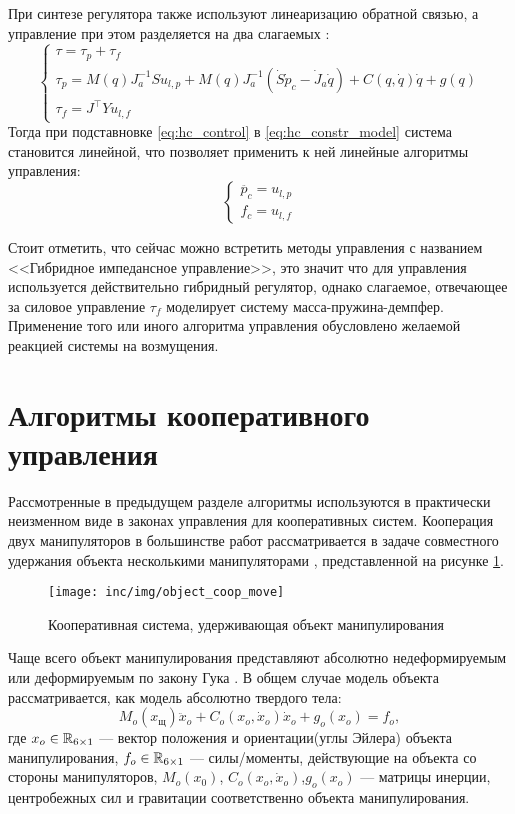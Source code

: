 При синтезе регулятора также используют линеаризацию обратной связью, а управление при этом разделяется на два слагаемых \cite{indirect_to_direct}:
\begin{equation}
  \begin{cases}
      \tau = \tau_p + \tau_f\\
      \tau_p = M(q) J_a^{-1} S u_{l,p} + M(q) J_a^{-1}\left(\dot{S}\dot{p}_c - \dot{J}_a\dot{q} \right) + C(q,\dot{q})\dot{q} + g(q)\\
      \tau_f = J^\top Y u_{l,f}
  \end{cases}
  \label{eq:hc_control}
\end{equation}
Тогда при подставновке \eqref{eq:hc_control} в \eqref{eq:hc_constr_model} система становится линейной, что позволяет применить к ней линейные алгоритмы управления:
\begin{equation}
  \begin{cases}
    \ddot{p_c} = u_{l,p}\\
    f_c = u_{l,f}
  \end{cases}
\end{equation}

Стоит отметить, что сейчас можно встретить методы управления с названием <<Гибридное импедансное управление>>, это значит что для управления используется действительно гибридный регулятор, однако слагаемое, отвечающее за силовое управление $\tau_f$ моделирует систему масса-пружина-демпфер. Применение того или иного алгоритма управления обусловлено желаемой реакцией системы на возмущения.

\section{Алгоритмы кооперативного управления}
Рассмотренные в предыдущем разделе алгоритмы используются в практически неизменном виде в законах управления для кооперативных систем. Кооперация двух манипуляторов в большинстве работ рассматривается в задаче совместного удержания объекта несколькими манипуляторами \cite{Bonitz1996, Erhart2015, Kido2010}, представленной на рисунке \ref{coop_obj_handle}.
\begin{figure}[ht]
  \texttt{[image: inc/img/object\_coop\_move]}
  \caption{Кооперативная система, удерживающая объект манипулирования}
  \label{coop_obj_handle}
\end{figure}

Чаще всего объект манипулирования представляют абсолютно недеформируемым \cite{Schneider1989} или деформируемым по закону Гука \cite{Sun1996}. В общем случае модель объекта рассматривается, как модель абсолютно твердого тела:
\begin{equation}
        M_o(x_щ)\ddot{x}_o + C_o(x_o,\dot{x}_o)\dot{x}_o + g_o(x_o) =  f_o ,
        \label{eq:obj_base_model}
    \end{equation}
где $x_o \in \mathbb{R}_{6\times1}$ --- вектор положения и ориентации(углы Эйлера) объекта манипулирования, $f_o \in \mathbb{R}_{6\times1}$ --- силы/моменты, действующие на объекта со стороны манипуляторов, $M_o(x_0)$, $C_o(x_o,\dot{x}_o)$,$g_o(x_o)$ --- матрицы инерции, центробежных сил и гравитации соответственно объекта манипулирования.

